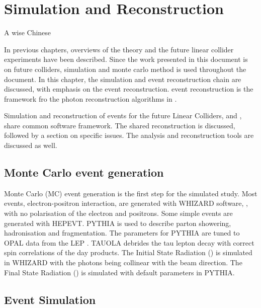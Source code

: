 \chapter{Simulation and Reconstruction}
\label{chap:Reconstruction}

%
{A wise Chinese}%


In previous chapters, overviews of the theory and the future linear collider experiments have been described. Since the work presented in this document is on future colliders, simulation and monte carlo method is used throughout the document. In this chapter, the simulation and event reconstruction chain are discussed, with emphasis on the \pandora event reconstruction. \pandora event reconstruction is the framework fro the photon reconstruction algorithms in . 

Simulation and reconstruction of events for the future Linear Colliders, \ILC and \CLIC, share common software framework. The shared reconstruction is discussed, followed by a section on \CLIC specific issues. The analysis and reconstruction tools  are discussed as well.

\section{Monte Carlo event generation}

Monte Carlo (MC) event generation is the first step for the simulated study. Most events, electron-positron interaction, are generated with WHIZARD software, \cite{whizard,Moretti:2001zz}, with no polarisation of the electron and positrons. Some simple events are generated with HEPEVT. PYTHIA \cite{Sjostrand:1995iq} is used to describe parton showering, hadronisation and fragmentation. The parameters for PYTHIA are tuned to OPAL data from the LEP \cite{Alexander:1995bk}. TAUOLA \cite{Jadach:1993hs} debrides the tau lepton decay with correct spin correlations of the day products. The Initial State Radiation (\ISR) is simulated in WHIZARD with the \ISR photons being collinear with the beam direction. The Final State Radiation (\FSR) is simulated with default parameters in PYTHIA.

\section{Event Simulation}

